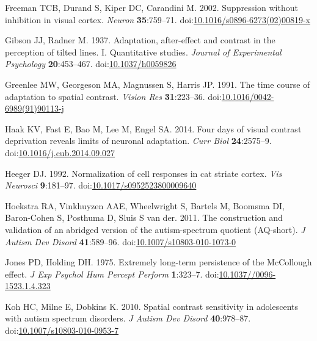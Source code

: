 \documentclass[
]{article}
\newlength{\cslhangindent}
\newlength{\cslentryspacingunit} %
\newenvironment{CSLReferences}[2] %
 {%
  \setlength{\parindent}{0pt}
  \ifodd #1
  \let\oldpar\par
  \def\par{\hangindent=\cslhangindent\oldpar}
  \fi
  \setlength{\parskip}{#2\cslentryspacingunit}
 }%
 {}
\begin{document}
\begin{CSLReferences}{1}{0}
\leavevmode{}%
Freeman TCB, Durand S, Kiper DC, Carandini M. 2002. Suppression without inhibition in visual cortex. \emph{Neuron} \textbf{35}:759--71. doi:\href{https://doi.org/10.1016/s0896-6273(02)00819-x}{10.1016/s0896-6273(02)00819-x}

\leavevmode{}%
Gibson JJ, Radner M. 1937. Adaptation, after-effect and contrast in the perception of tilted lines. {I}. {Quantitative} studies. \emph{Journal of Experimental Psychology} \textbf{20}:453--467. doi:\href{https://doi.org/10.1037/h0059826}{10.1037/h0059826}

\leavevmode{}%
Greenlee MW, Georgeson MA, Magnussen S, Harris JP. 1991. The time course of adaptation to spatial contrast. \emph{Vision Res} \textbf{31}:223--36. doi:\href{https://doi.org/10.1016/0042-6989(91)90113-j}{10.1016/0042-6989(91)90113-j}

\leavevmode{}%
Haak KV, Fast E, Bao M, Lee M, Engel SA. 2014. Four days of visual contrast deprivation reveals limits of neuronal adaptation. \emph{Curr Biol} \textbf{24}:2575--9. doi:\href{https://doi.org/10.1016/j.cub.2014.09.027}{10.1016/j.cub.2014.09.027}

\leavevmode{}%
Heeger DJ. 1992. Normalization of cell responses in cat striate cortex. \emph{Vis Neurosci} \textbf{9}:181--97. doi:\href{https://doi.org/10.1017/s0952523800009640}{10.1017/s0952523800009640}

\leavevmode{}%
Hoekstra RA, Vinkhuyzen AAE, Wheelwright S, Bartels M, Boomsma DI, Baron-Cohen S, Posthuma D, Sluis S van der. 2011. The construction and validation of an abridged version of the autism-spectrum quotient (AQ-short). \emph{J Autism Dev Disord} \textbf{41}:589--96. doi:\href{https://doi.org/10.1007/s10803-010-1073-0}{10.1007/s10803-010-1073-0}

\leavevmode{}%
Jones PD, Holding DH. 1975. Extremely long-term persistence of the McCollough effect. \emph{J Exp Psychol Hum Percept Perform} \textbf{1}:323--7. doi:\href{https://doi.org/10.1037//0096-1523.1.4.323}{10.1037//0096-1523.1.4.323}

\leavevmode{}%
Koh HC, Milne E, Dobkins K. 2010. Spatial contrast sensitivity in adolescents with autism spectrum disorders. \emph{J Autism Dev Disord} \textbf{40}:978--87. doi:\href{https://doi.org/10.1007/s10803-010-0953-7}{10.1007/s10803-010-0953-7}


\end{CSLReferences}
\end{document}
